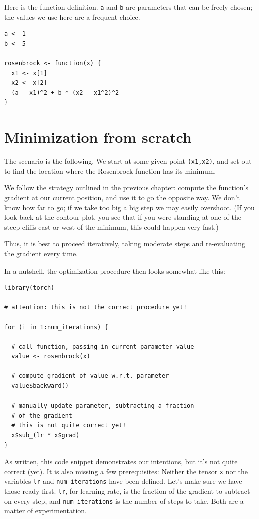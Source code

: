 \documentclass[
  letterpaper,
]{krantz}
\begin{document}
Here is the function definition. \texttt{a} and \texttt{b} are
parameters that can be freely chosen; the values we use here are a
frequent choice.

\begin{verbatim}
a <- 1
b <- 5

rosenbrock <- function(x) {
  x1 <- x[1]
  x2 <- x[2]
  (a - x1)^2 + b * (x2 - x1^2)^2
}
\end{verbatim}

\hypertarget{minimization-from-scratch}{%
\section{Minimization from scratch}\label{minimization-from-scratch}}

The scenario is the following. We start at some given point
\texttt{(x1,x2)}, and set out to find the location where the Rosenbrock
function has its minimum.

We follow the strategy outlined in the previous chapter: compute the
function's gradient at our current position, and use it to go the
opposite way. We don't know how far to go; if we take too big a big step
we may easily overshoot. (If you look back at the contour plot, you see
that if you were standing at one of the steep cliffs east or west of the
minimum, this could happen very fast.)

Thus, it is best to proceed iteratively, taking moderate steps and
re-evaluating the gradient every time.

In a nutshell, the optimization procedure then looks somewhat like this:

\begin{verbatim}
library(torch)

# attention: this is not the correct procedure yet!

for (i in 1:num_iterations) {

  # call function, passing in current parameter value
  value <- rosenbrock(x)

  # compute gradient of value w.r.t. parameter
  value$backward()

  # manually update parameter, subtracting a fraction
  # of the gradient
  # this is not quite correct yet!
  x$sub_(lr * x$grad)
}
\end{verbatim}

As written, this code snippet demonstrates our intentions, but it's not
quite correct (yet). It is also missing a few prerequisites: Neither the
tensor \texttt{x} nor the variables \texttt{lr} and
\texttt{num\_iterations} have been defined. Let's make sure we have
those ready first. \texttt{lr}, for learning rate, is the fraction of
the gradient to subtract on every step, and \texttt{num\_iterations} is
the number of steps to take. Both are a matter of experimentation.
\end{document}
